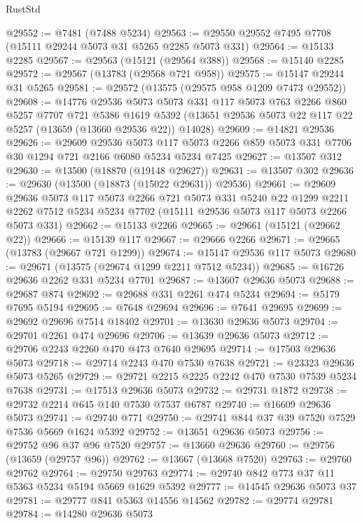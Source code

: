 \begin{lexlean}{RustStd}
\begin{coremodule}
@29552 := @7481 (@7488 @5234)
@29563 := @29550 @29552 @7495 @7708 (@15111 @29244 @5073 @31 @5265 @2285 @5073 @331)
@29564 := @15133 @2285
@29567 := @29563 (@15121 (@29564 @388))
@29568 := @15140 @2285
@29572 := @29567 (@13783 (@29568 @721 @958))
@29575 := @15147 @29244 @31 @5265
@29581 := @29572 (@13575 (@29575 @958 @1209 @7473 @29552))
@29608 := @14776
    @29536
    @5073
    @5073
    @331
    @117
    @5073
    @763
    @2266
    @860
    @5257
    @7707
    @721
    @5386
    @1619
    @5392
    (@13651 @29536 @5073 @22 @117 @22 @5257 (@13659 (@13660 @29536 @22)) @14028)
@29609 := @14821 @29536
@29626 := @29609
    @29536
    @5073
    @117
    @5073
    @2266
    @859
    @5073
    @331
    @7706
    @30
    @1294
    @721
    @2166
    @6080
    @5234
    @5234
    @7425
@29627 := @13507 @312
@29630 := @13500 (@18870 (@19148 @29627))
@29631 := @13507 @302
@29636 := @29630 (@13500 (@18873 (@15022 @29631)) @29536)
@29661 := @29609
    @29636
    @5073
    @117
    @5073
    @2266
    @721
    @5073
    @331
    @5240
    @22
    @1299
    @2211
    @2262
    @7512
    @5234
    @5234
    @7702
    (@15111 @29536 @5073 @117 @5073 @2266 @5073 @331)
@29662 := @15133 @2266
@29665 := @29661 (@15121 (@29662 @22))
@29666 := @15139 @117
@29667 := @29666 @2266
@29671 := @29665 (@13783 (@29667 @721 @1299))
@29674 := @15147 @29536 @117 @5073
@29680 := @29671 (@13575 (@29674 @1299 @2211 @7512 @5234))
@29685 := @16726 @29636 @2262 @331 @5234 @7701
@29687 := @13607 @29636 @5073
@29688 := @29687 @874
@29692 := @29688 @331 @2261 @474 @5234
@29694 := @5179 @7695 @5194
@29695 := @7648 @29694
@29696 := @7641 @29695
@29699 := @29692 @29696 @7514 @18402
@29701 := @13630 @29636 @5073
@29704 := @29701 @2261 @474 @29696
@29706 := @13639 @29636 @5073
@29712 := @29706 @2243 @2260 @470 @473 @7640 @29695
@29714 := @17503 @29636 @5073
@29718 := @29714 @2243 @470 @7530 @7638
@29721 := @23323 @29636 @5073 @5265
@29729 := @29721 @2215 @2225 @2242 @470 @7530 @7539 @5234 @7638
@29731 := @17513 @29636 @5073
@29732 := @29731 @1872
@29738 := @29732 @2214 @645 @140 @7530 @7537 @6787
@29740 := @16609 @29636 @5073
@29741 := @29740 @771
@29750 := @29741 @844 @37 @39 @7520 @7529 @7536 @5669 @1624 @5392
@29752 := @13651 @29636 @5073
@29756 := @29752 @96 @37 @96 @7520
@29757 := @13660 @29636
@29760 := @29756 (@13659 (@29757 @96))
@29762 := @13667 (@13668 @7520)
@29763 := @29760 @29762
@29764 := @29750 @29763
@29774 := @29740 @842 @773 @37 @11 @5363 @5234 @5194 @5669 @1629 @5392
@29777 := @14545 @29636 @5073 @37
@29781 := @29777 @841 @5363 @14556 @14562
@29782 := @29774 @29781
@29784 := @14280 @29636 @5073

\end{coremodule}
\end{lexlean}
